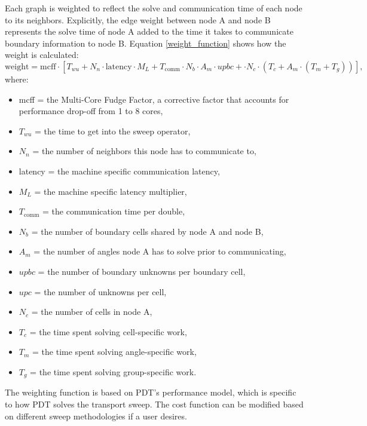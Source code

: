 Each graph is weighted to reflect the solve and communication time of each node to its neighbors. Explicitly, the edge weight between node A and node B represents the solve time of node A added to the time it takes to communicate boundary information to node B. Equation \ref{weight_function} shows how the weight is calculated:
\begin{equation}
\text{weight} = \text{mcff}\cdot [T_{wu} + N_n\cdot \text{latency}\cdot M_L + T_{\text{comm}}\cdot N_b\cdot A_m\cdot upbc + \cdot N_c\cdot (T_c + A_m\cdot (T_m + T_g))],
\label{weight_function}
\end{equation}
where:
\begin{itemize}
  \item mcff = the Multi-Core Fudge Factor, a corrective factor that accounts for performance drop-off from 1 to 8 cores,
  \item $T_{wu}$ = the time to get into the sweep operator,
  \item $N_n$ = the number of neighbors this node has to communicate to,
  \item latency = the machine specific communication latency,
  \item $M_L$ = the machine specific latency multiplier,
  \item $T_{\text{comm}}$ = the communication time per double,
  \item $N_b$ = the number of boundary cells shared by node A and node B,
  \item $A_m$ = the number of angles node A has to solve prior to communicating,
  \item $upbc$ = the number of boundary unknowns per boundary cell,
  \item $upc$ = the number of unknowns per cell,
  \item $N_c$ = the number of cells in node A,
  \item $T_c$ = the time spent solving cell-specific work,
  \item $T_m$ = the time spent solving angle-specific work,
  \item $T_g$ = the time spent solving group-specific work.
\end{itemize}
The weighting function is based on PDT's performance model\cite{mpadams15}, which is specific to how PDT solves the transport sweep. The cost function can be modified based on different sweep methodologies if a user desires.

